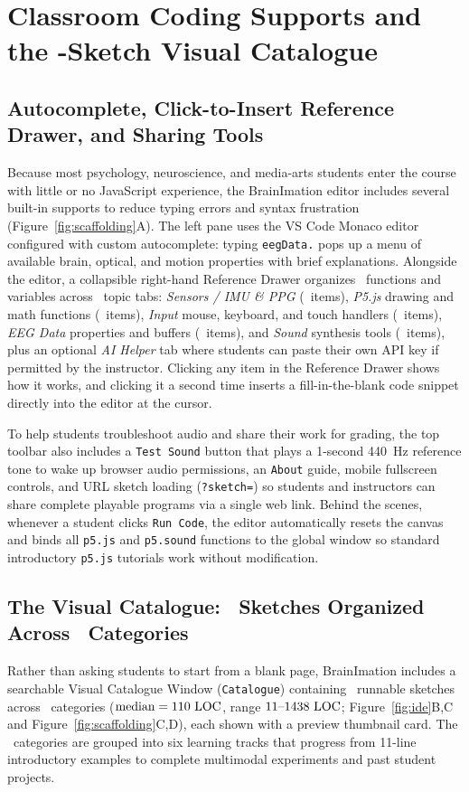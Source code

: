 \documentclass[11pt]{article}
\begin{document}
\section{Classroom Coding Supports and the \NCatalogueSketches-Sketch Visual Catalogue}

\subsection{Autocomplete, Click-to-Insert Reference Drawer, and Sharing Tools}
Because most psychology, neuroscience, and media-arts students enter the course with little or no JavaScript experience, the BrainImation editor includes several built-in supports to reduce typing errors and syntax frustration (Figure~\ref{fig:scaffolding}A). The left pane uses the VS Code Monaco editor configured with custom autocomplete: typing \texttt{eegData.} pops up a menu of available brain, optical, and motion properties with brief explanations. Alongside the editor, a collapsible right-hand Reference Drawer organizes \NRefAPIs\ functions and variables across \NRefTabs\ topic tabs: \emph{Sensors / IMU \& PPG} (\NRefSensors\ items), \emph{P5.js} drawing and math functions (\NRefPFive\ items), \emph{Input} mouse, keyboard, and touch handlers (\NRefInput\ items), \emph{EEG Data} properties and buffers (\NRefEEGData\ items), and \emph{Sound} synthesis tools (\NRefSound\ items), plus an optional \emph{AI Helper} tab where students can paste their own API key if permitted by the instructor. Clicking any item in the Reference Drawer shows how it works, and clicking it a second time inserts a fill-in-the-blank code snippet directly into the editor at the cursor.

To help students troubleshoot audio and share their work for grading, the top toolbar also includes a \texttt{Test Sound} button that plays a 1-second 440~Hz reference tone to wake up browser audio permissions, an \texttt{About} guide, mobile fullscreen controls, and URL sketch loading (\texttt{?sketch=}) so students and instructors can share complete playable programs via a single web link. Behind the scenes, whenever a student clicks \texttt{Run Code}, the editor automatically resets the canvas and binds all \texttt{p5.js} and \texttt{p5.sound} functions to the global window so standard introductory \texttt{p5.js} tutorials work without modification.

\subsection{The Visual Catalogue: \NCatalogueSketches\ Sketches Organized Across \NCatalogueCategories\ Categories}
Rather than asking students to start from a blank page, BrainImation includes a searchable Visual Catalogue Window (\texttt{Catalogue}) containing \NCatalogueSketches\ runnable sketches across \NCatalogueCategories\ categories ($\text{median} = 110\text{ LOC}$, range $11\text{--}1438\text{ LOC}$; Figure~\ref{fig:ide}B,C and Figure~\ref{fig:scaffolding}C,D), each shown with a preview thumbnail card. The \NCatalogueCategories\ categories are grouped into six learning tracks that progress from 11-line introductory examples to complete multimodal experiments and past student projects.
\end{document}
